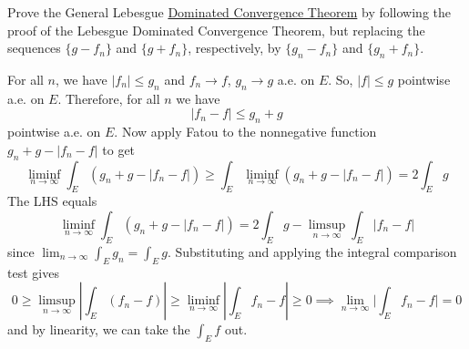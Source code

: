   \begin{exercise}[Royden 4.32]
    Prove the General Lebesgue \hyperref[thm:dominated-convergence-theorem]{Dominated Convergence Theorem} by following the proof of the Lebesgue Dominated Convergence Theorem, but replacing the sequences $\{g - f_n\}$ and $\{g + f_n\}$, respectively, by $\{g_n - f_n\}$ and $\{g_n + f_n\}$.
  \end{exercise}
  \begin{solution}
    For all $n$, we have $|f_n| \leq g_n$ and $f_n \to f$, $g_n \to g$ a.e. on $E$. So, $|f| \leq g$ pointwise a.e. on $E$. Therefore, for all $n$ we have
    \begin{equation}
      |f_n - f| \leq g_n + g
    \end{equation}
    pointwise a.e. on $E$. Now apply Fatou to the nonnegative function $g_n + g - |f_n - f|$ to get 
    \begin{equation}
      \liminf_{n \to \infty} \int_E (g_n + g - |f_n - f|) \geq \int_E \liminf_{n \to \infty}(g_n + g - |f_n - f|) = 2 \int_E g
    \end{equation}
    The LHS equals 
    \begin{equation}
      \liminf_{n \to \infty} \int_E (g_n + g - |f_n - f|) = 2 \int_E g - \limsup_{n \to \infty} \int_E |f_n - f|
    \end{equation}
    since $\lim_{n \to \infty} \int_E g_n = \int_E g$. Substituting and applying the integral comparison test gives 
    \begin{equation}
      0 \geq \limsup_{n \to \infty} \left| \int_E (f_n - f) \right| \geq \liminf_{n \to \infty} \left| \int_E f_n - f \right| \geq 0 \implies \lim_{n \to \infty} \bigg| \int_E f_n - f \bigg| = 0  
    \end{equation}
    and by linearity, we can take the $\int_E f$ out. 
  \end{solution}

